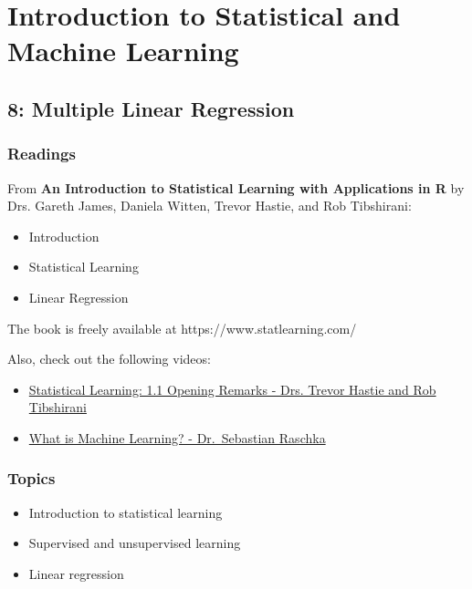 \documentclass[
  letterpaper,
  DIV=11,
  numbers=noendperiod]{scrreprt}
\begin{document}
\part{Introduction to Statistical and Machine Learning}

\chapter{8: Multiple Linear
Regression}\label{multiple-linear-regression}

\section{Readings}\label{readings-9}

From \textbf{An Introduction to Statistical Learning with Applications
in R} by Drs. Gareth James, Daniela Witten, Trevor Hastie, and Rob
Tibshirani:

\begin{itemize}
\item
  Introduction
\item
  Statistical Learning
\item
  Linear Regression
\end{itemize}

The book is freely available at https://www.statlearning.com/

Also, check out the following videos:

\begin{itemize}
\item
  \href{https://youtu.be/LvySJGj-88U?si=bCpk45qvFUK3U0pJ}{Statistical
  Learning: 1.1 Opening Remarks - Drs. Trevor Hastie and Rob Tibshirani}
\item
  \href{https://youtu.be/z7RT6aAt_10?si=Gch7GXpR_qK3sEPz}{What is
  Machine Learning? - Dr.~Sebastian Raschka}
\end{itemize}

\section{Topics}\label{topics-11}

\begin{itemize}
\item
  Introduction to statistical learning
\item
  Supervised and unsupervised learning
\item
  Linear regression
\end{itemize}
\end{document}
